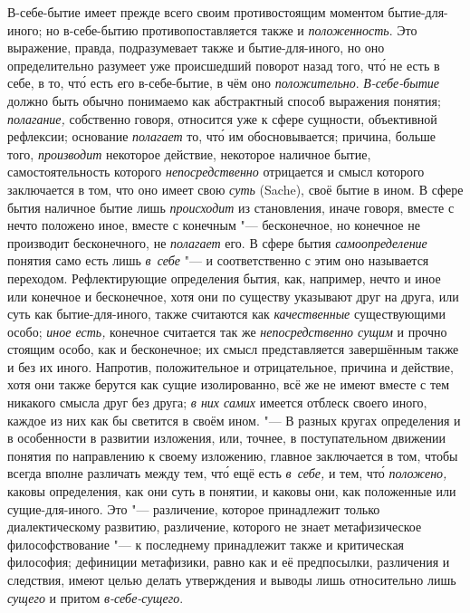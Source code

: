 В-себе-бытие имеет прежде всего своим противостоящим моментом
бытие-для-иного; но в-себе-бытию противопоставляется также и
{\em положенность}. Это выражение, правда,
подразумевает также и бытие-для-иного, но оно определительно разумеет уже
происшедший поворот назад того, чт\'{о} не есть в себе, в то, чт\'{о} есть его
в-себе-бытие, в чём оно {\em положительно}.
{\em В-себе-бытие} должно быть обычно понимаемо как
абстрактный способ выражения понятия; {\em полагание,}
собственно говоря, относится уже к сфере сущности, объективной рефлексии;
основание {\em полагает} то, чт\'{о} им обосновывается;
причина, больше того, {\em производит} некоторое
действие, некоторое наличное бытие, самостоятельность которого
{\em непосредственно} отрицается и смысл которого
заключается в том, что оно имеет свою {\em суть}
(Sache), своё бытие в ином. В сфере бытия наличное бытие лишь
{\em происходит} из становления, иначе говоря, вместе с нечто
положено иное, вместе с конечным "--- бесконечное, но конечное не
производит бесконечного, не {\em полагает} его. В сфере
бытия {\em самоопределение} понятия само есть лишь
{\em в~себе} "--- и соответственно с этим оно называется
переходом. Рефлектирующие определения бытия, как, например, нечто и иное
или конечное и бесконечное, хотя они по существу указывают друг на друга,
или суть как бытие-для-иного, также считаются как
{\em качественные} существующими особо;
{\em иное есть,} конечное считается так же
{\em непосредственно сущим} и прочно стоящим особо, как
и бесконечное; их смысл представляется завершённым также и без их иного.
Напротив, положительное и отрицательное, причина и действие, хотя они также
берутся как сущие изолированно, всё же не имеют вместе с тем никакого
смысла друг без друга; {\em в них самих} имеется
отблеск своего иного, каждое из них как бы светится в своём ином. "--- В
разных кругах определения и в особенности в развитии
изложения, или, точнее, в поступательном движении понятия по направлению к
своему изложению, главное заключается в том, чтобы всегда вполне различать
между тем, чт\'{о} ещё есть {\em в~себе,} и тем, чт\'{о}
{\em положено,} каковы определения, как они суть в
понятии, и каковы они, как положенные или сущие-для-иного. Это
"--- различение, которое принадлежит только диалектическому развитию,
различение, которого не знает метафизическое философствование "--- к
последнему принадлежит также и критическая философия; дефиниции метафизики,
равно как и её предпосылки, различения и следствия, имеют целью делать
утверждения и выводы лишь относительно лишь {\em сущего} и
притом {\em в-себе-сущего}.

